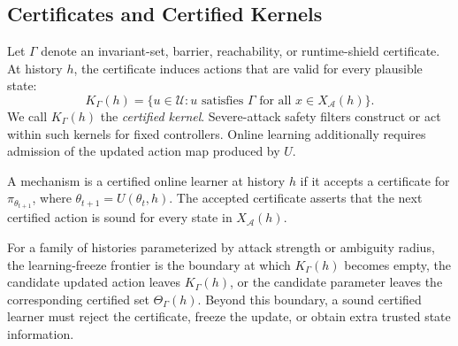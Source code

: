 \subsection{Certificates and Certified Kernels}

Let $\Gamma$ denote an invariant-set, barrier, reachability, or runtime-shield
certificate.  At history $h$, the certificate induces actions that are valid
for every plausible state:
\begin{equation}
    K_\Gamma(h)=\{u\in\mathcal U: u \text{ satisfies } \Gamma \text{ for all } x\in X_{\mathcal A}(h)\}.
\end{equation}
We call $K_\Gamma(h)$ the \emph{certified kernel}.  Severe-attack safety
filters construct or act within such kernels for fixed controllers.  Online
learning additionally requires admission of the updated action map produced by
$U$.

\begin{definition}
A mechanism is a certified online learner at history $h$ if it accepts a
certificate for $\pi_{\theta_{t+1}}$, where
$\theta_{t+1}=U(\theta_t,h)$.  The accepted certificate asserts that the next
certified action is sound for every state in $X_{\mathcal A}(h)$.
\end{definition}

\begin{definition}
For a family of histories parameterized by attack strength or ambiguity
radius, the learning-freeze frontier is the boundary at which
$K_\Gamma(h)$ becomes empty, the candidate updated action leaves
$K_\Gamma(h)$, or the candidate parameter leaves the corresponding certified
set $\Theta_\Gamma(h)$. Beyond this boundary, a sound certified learner must
reject the certificate, freeze the update, or obtain extra trusted state
information.
\end{definition}
